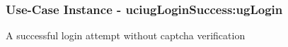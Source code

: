 
	\subsubsection{Use-Case Instance - uciugLoginSuccess:ugLogin}
	
	A successful login attempt without captcha verification		  
	\begin{operationmodel}
	
	\end{operationmodel} 

	

